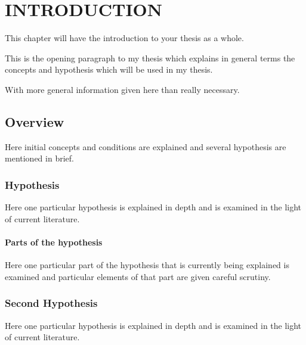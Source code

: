 \chapter{INTRODUCTION}
This chapter will have the introduction to your thesis as a whole.

This is the opening paragraph to my thesis which
explains in general terms the concepts and hypothesis
which will be used in my thesis.

With more general information given here than really
necessary.

\section{Overview}

Here initial concepts and conditions are explained and
several hypothesis are mentioned in brief.

\subsection{Hypothesis}

Here one particular hypothesis is explained in depth
and is examined in the light of current literature.

\subsubsection{Parts of the hypothesis}

Here one particular part of the hypothesis that is 
currently being explained is examined and particular
elements of that part are given careful scrutiny.


\subsection{Second Hypothesis}

Here one particular hypothesis is explained in depth
and is examined in the light of current literature.

